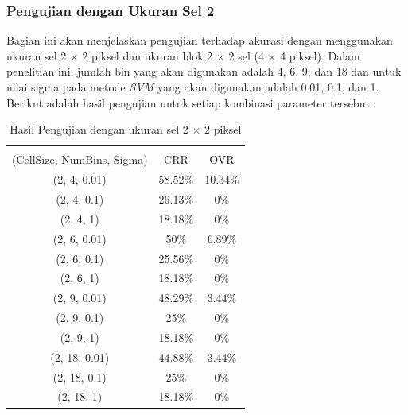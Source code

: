 \subsubsection{Pengujian dengan Ukuran Sel 2}
Bagian ini akan menjelaskan pengujian terhadap akurasi dengan menggunakan ukuran sel 2 $\times$ 2 piksel dan ukuran blok 2 $\times$ 2 sel (4 $\times$ 4 piksel). Dalam penelitian ini, jumlah bin yang akan digunakan adalah 4, 6, 9, dan 18 dan untuk nilai sigma pada metode \textit{SVM} yang akan digunakan adalah 0.01, 0.1, dan 1. Berikut adalah hasil pengujian untuk setiap kombinasi parameter tersebut:
\begin{longtable}[c]{|c|c|c|}
	\caption{Hasil Pengujian dengan ukuran sel 2 $\times$ 2 piksel}
	\label{tab:HasilPengujianSel2}\\
	\hline
	\begin{tabular}[c]{@{}c@{}}Parameter\\ (CellSize, NumBins, Sigma)\end{tabular} & CRR     & OVR     \\ \hline
	\endhead
	(2, 4, 0.01)                                                                   & {\color[HTML]{FE0000} 58.52\%} & {\color[HTML]{FE0000} 10.34\%} \\ \hline
	(2, 4, 0.1)                                                                    & 26.13\% & 0\%     \\ \hline
	(2, 4, 1)                                                                      & 18.18\% & 0\%     \\ \hline
	(2, 6, 0.01)                                                                   & 50\%    & 6.89\%  \\ \hline
	(2, 6, 0.1)                                                                    & 25.56\% & 0\%     \\ \hline
	(2, 6, 1)                                                                      & 18.18\% & 0\%     \\ \hline
	(2, 9, 0.01)                                                                   & 48.29\% & 3.44\%  \\ \hline
	(2, 9, 0.1)                                                                    & 25\%    & 0\%     \\ \hline
	(2, 9, 1)                                                                      & 18.18\% & 0\%     \\ \hline
	(2, 18, 0.01)                                                                  & 44.88\% & 3.44\%  \\ \hline
	(2, 18, 0.1)                                                                   & 25\%    & 0\%     \\ \hline
	(2, 18, 1)                                                                     & 18.18\% & 0\%     \\ \hline
\end{longtable}
